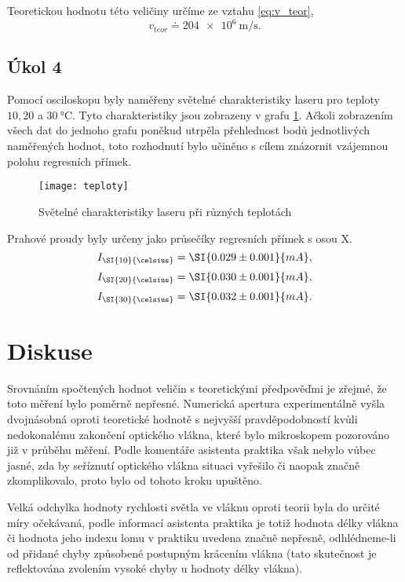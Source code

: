 \documentclass{protokol}
\begin{document}
      Teoretickou hodnotu této veličiny určíme ze vztahu \eqref{eq:v_teor},
      $$ v_{teor} \doteq \SI{204 e6}{\metre\per\second}. $$

    \subsection*{Úkol 4}

      Pomocí osciloskopu byly naměřeny světelné charakteristiky laseru pro teploty $10, 20$ a $\SI{30}{\celsius}$. Tyto charakteristiky jsou zobrazeny v grafu \ref{fig:teploty}. Ačkoli zobrazením všech dat do jednoho grafu poněkud utrpěla přehlednost bodů jednotlivých naměřených hodnot, toto rozhodnutí bylo učiněno s cílem znázornit vzájemnou polohu regresních přímek.

      \begin{figure}[H]
        \centering
        \texttt{[image: teploty]}
        \caption{Světelné charakteristiky laseru při různých teplotách}
        \label{fig:teploty}
      \end{figure}

      Prahové proudy byly určeny jako průsečíky regresních přímek s osou X.
      $$ I_{\SI{10}{\celsius}} = \SI{0.029 \pm 0.001}{mA}, $$
      $$ I_{\SI{20}{\celsius}} = \SI{0.030 \pm 0.001}{mA}, $$
      $$ I_{\SI{30}{\celsius}} = \SI{0.032 \pm 0.001}{mA}.  $$

  \section*{Diskuse}

    Srovnáním spočtených hodnot veličin s teoretickými předpověďmi je zřejmé, že toto měření bylo poměrně nepřesné. Numerická apertura experimentálně vyšla dvojnásobná oproti teoretické hodnotě s nejvyšší pravděpodobností kvůli nedokonalému zakončení optického vlákna, které bylo mikroskopem pozorováno již v průběhu měření. Podle komentáře asistenta praktika však nebylo vůbec jasné, zda by seříznutí optického vlákna situaci vyřešilo či naopak značně zkomplikovalo, proto bylo od tohoto kroku upuštěno.

    Velká odchylka hodnoty rychlosti světla ve vláknu oproti teorii byla do určité míry očekávaná, podle informací asistenta praktika je totiž hodnota délky vlákna či hodnota jeho indexu lomu v praktiku uvedena značně nepřesně, odhlédneme-li od přidané chyby způsobené postupným krácením vlákna (tato skutečnost je reflektována zvolením vysoké chyby u hodnoty délky vlákna).
\end{document}

